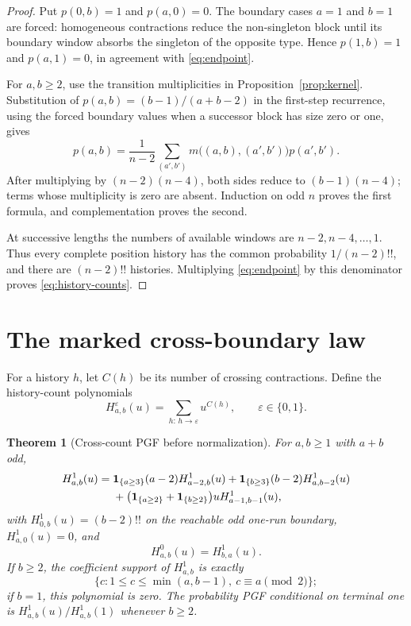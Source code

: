 \documentclass[10pt,a4paper]{amsart}
\newtheorem{theorem}{Theorem}[section]
\theoremstyle{remark}
\newcommand{\1}{\mathbf 1}
\begin{document}
\begin{proof}
Put $p(0,b)=1$ and $p(a,0)=0$.  The boundary cases $a=1$ and $b=1$ are
forced: homogeneous contractions reduce the non-singleton block until its
boundary window absorbs the singleton of the opposite type.  Hence
$p(1,b)=1$ and $p(a,1)=0$, in agreement with \eqref{eq:endpoint}.

For $a,b\geq2$, use the transition multiplicities in
Proposition~\ref{prop:kernel}.  Substitution of
$p(a,b)=(b-1)/(a+b-2)$ in the first-step recurrence, using the forced boundary
values when a successor block has size zero or one, gives
\[
 p(a,b)=\frac{1}{n-2}\sum_{(a',b')}
       m\bigl((a,b),(a',b')\bigr)p(a',b').
\]
After multiplying by $(n-2)(n-4)$, both sides reduce to
$(b-1)(n-4)$; terms whose multiplicity is zero are absent.  Induction on odd
$n$ proves the first formula, and complementation proves the second.

At successive lengths the numbers of available windows are
$n-2,n-4,\ldots,1$.  Thus every complete position history has the common
probability $1/(n-2)!!$, and there are $(n-2)!!$ histories.  Multiplying
\eqref{eq:endpoint} by this denominator proves \eqref{eq:history-counts}.
\end{proof}

\section{The marked cross-boundary law}

For a history $h$, let $C(h)$ be its number of crossing contractions.  Define
the history-count polynomials
\[
 H^\varepsilon_{a,b}(u)=
 \sum_{h:\,h\to\varepsilon}u^{C(h)},\qquad \varepsilon\in\{0,1\}.
\]

\begin{theorem}[Cross-count PGF before normalization]\label{thm:cross-pgf}
For $a,b\geq1$ with $a+b$ odd,
\begin{align}
H^1_{a,b}(u)
={}&\1_{\{a\geq3\}}(a-2)H^1_{a-2,b}(u)
 +\1_{\{b\geq3\}}(b-2)H^1_{a,b-2}(u) \notag\\
&+\bigl(\1_{\{a\geq2\}}+\1_{\{b\geq2\}}\bigr)
 uH^1_{a-1,b-1}(u),                                      \label{eq:cross-rec}
\end{align}
with $H^1_{0,b}(u)=(b-2)!!$ on the reachable odd one-run boundary,
$H^1_{a,0}(u)=0$, and
\begin{equation}\label{eq:symmetry}
 H^0_{a,b}(u)=H^1_{b,a}(u).
\end{equation}
If $b\geq2$, the coefficient support of $H^1_{a,b}$ is exactly
\begin{equation}\label{eq:support}
 \{c:1\leq c\leq\min(a,b-1),\ c\equiv a\pmod 2\};
\end{equation}
if $b=1$, this polynomial is zero.
The probability PGF conditional on terminal one is
$H^1_{a,b}(u)/H^1_{a,b}(1)$ whenever $b\geq2$.
\end{theorem}
\end{document}

